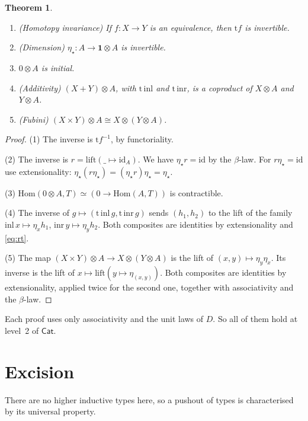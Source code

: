 \documentclass[11pt]{amsart}
\numberwithin{equation}{section}
\newtheorem{theorem}{Theorem}[section]
\theoremstyle{definition}
\theoremstyle{remark}
\newcommand{\Cat}{\mathsf{Cat}}
\newcommand{\Hom}{\mathrm{Hom}}
\newcommand{\id}{\mathrm{id}}
\newcommand{\one}{\mathbf{1}}
\newcommand{\tmap}{\mathrm{t}}
\begin{document}
\begin{theorem}
\begin{enumerate}
\item (Homotopy invariance) If $f:X\to Y$ is an equivalence, then $\tmap f$ is
  invertible.
\item (Dimension) $\eta_\star : A\to \one\otimes A$ is invertible.
\item $0\otimes A$ is initial.
\item (Additivity) $(X+Y)\otimes A$, with $\tmap\,\mathrm{inl}$ and
  $\tmap\,\mathrm{inr}$, is a coproduct of $X\otimes A$ and $Y\otimes A$.
\item (Fubini) $(X\times Y)\otimes A\cong X\otimes(Y\otimes A)$.
\end{enumerate}
\end{theorem}
\begin{proof}
(1) The inverse is $\tmap f^{-1}$, by functoriality.

(2) The inverse is $r=\mathrm{lift}(\_\mapsto\id_A)$. We have $\eta_\star r=\id$
by the $\beta$-law. For $r\eta_\star=\id$ use extensionality:
$\eta_\star(r\eta_\star)=(\eta_\star r)\eta_\star=\eta_\star$.

(3) $\Hom(0\otimes A,T)\simeq(0\to\Hom(A,T))$ is contractible.

(4) The inverse of $g\mapsto(\tmap\,\mathrm{inl}\,g,\tmap\,\mathrm{inr}\,g)$
sends $(h_1,h_2)$ to the lift of the family
$\mathrm{inl}\,x\mapsto\eta_x h_1$, $\mathrm{inr}\,y\mapsto \eta_y h_2$. Both
composites are identities by extensionality and \eqref{eq:rt}.

(5) The map $(X\times Y)\otimes A\to X\otimes(Y\otimes A)$ is the lift of
$(x,y)\mapsto \eta_y\eta_x$. Its inverse is the lift of
$x\mapsto\mathrm{lift}(y\mapsto\eta_{(x,y)})$. Both composites are identities by
extensionality, applied twice for the second one, together with associativity
and the $\beta$-law.
\end{proof}

Each proof uses only associativity and the unit laws of $D$. So all of them
hold at level~2 of $\Cat$.

\section{Excision}

There are no higher inductive types here, so a pushout of types is
characterised by its universal property.
\end{document}
